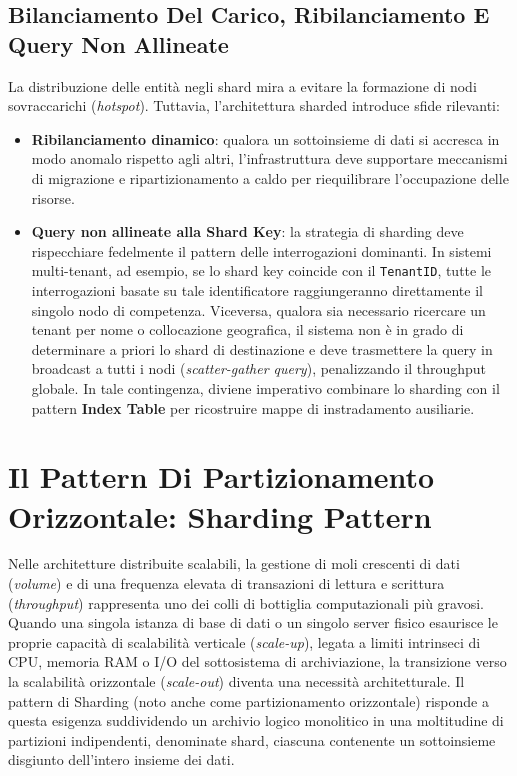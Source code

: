 \documentclass[11pt, a4paper]{article}
\begin{document}
\subsection{Bilanciamento Del Carico, Ribilanciamento E Query Non Allineate}

La distribuzione delle entità negli shard mira a evitare la formazione di nodi sovraccarichi (\emph{hotspot}). Tuttavia, l'architettura sharded introduce sfide rilevanti:
\begin{itemize}
    \item \textbf{Ribilanciamento dinamico}: qualora un sottoinsieme di dati si accresca in modo anomalo rispetto agli altri, l'infrastruttura deve supportare meccanismi di migrazione e ripartizionamento a caldo per riequilibrare l'occupazione delle risorse.
    \item \textbf{Query non allineate alla Shard Key}: la strategia di sharding deve rispecchiare fedelmente il pattern delle interrogazioni dominanti. In sistemi multi-tenant, ad esempio, se lo shard key coincide con il \texttt{TenantID}, tutte le interrogazioni basate su tale identificatore raggiungeranno direttamente il singolo nodo di competenza. Viceversa, qualora sia necessario ricercare un tenant per nome o collocazione geografica, il sistema non è in grado di determinare a priori lo shard di destinazione e deve trasmettere la query in broadcast a tutti i nodi (\emph{scatter-gather query}), penalizzando il throughput globale. In tale contingenza, diviene imperativo combinare lo sharding con il pattern \textbf{Index Table} per ricostruire mappe di instradamento ausiliarie.
\end{itemize}



\section{Il Pattern Di Partizionamento Orizzontale: Sharding Pattern}

Nelle architetture distribuite scalabili, la gestione di moli crescenti di dati (\emph{volume}) e di una frequenza elevata di transazioni di lettura e scrittura (\emph{throughput}) rappresenta uno dei colli di bottiglia computazionali più gravosi. Quando una singola istanza di base di dati o un singolo server fisico esaurisce le proprie capacità di scalabilità verticale (\emph{scale-up}), legata a limiti intrinseci di CPU, memoria RAM o I/O del sottosistema di archiviazione, la transizione verso la scalabilità orizzontale (\emph{scale-out}) diventa una necessità architetturale. Il pattern di Sharding (noto anche come partizionamento orizzontale) risponde a questa esigenza suddividendo un archivio logico monolitico in una moltitudine di partizioni indipendenti, denominate shard, ciascuna contenente un sottoinsieme disgiunto dell'intero insieme dei dati.
\end{document}
